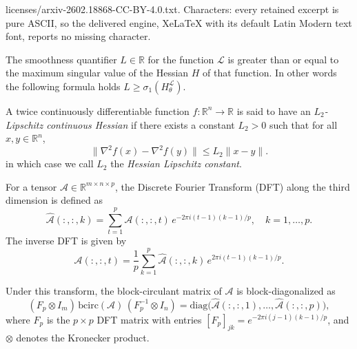 \documentclass[10pt,a4paper]{amsart}
\begin{document}
licenses/arxiv-2602.18868-CC-BY-4.0.txt. Characters: every retained excerpt is pure ASCII, so the delivered engine, XeLaTeX with its default Latin Modern text font, reports no missing character.
\begin{proposition}
\label{prop:L-lower-bound-app}
The smoothness quantifier $L \in \mathbb{R}$ for the function $\mathcal{L}$ is greater than or equal to the maximum singular value of the Hessian $H$ of that function. In other words the following formula holds
$L \geq \sigma_1(H_{\theta}^{\mathcal{L}})$.
\end{proposition}

\begin{definition}
\label{def:lip-cont-hes}
A twice continuously differentiable function $f:\mathbb{R}^n\to\mathbb{R}$ 
is said to have an \emph{$L_2$-Lipschitz continuous Hessian} if there exists a constant $L_2>0$ such that
for all $x,y\in\mathbb{R}^n$,
\[
\|\nabla^{2} f(x)-\nabla^{2} f(y)\|\le L_2\|x-y\|.
\]
in which case we call $L_2$ the \emph{Hessian Lipschitz constant}.
\end{definition}

\begin{definition}
\label{def:dft}
For a tensor $\mathcal{A}\in\mathbb{R}^{m\times n\times p}$, 
the Discrete Fourier Transform (DFT) along the third dimension is defined as
\[
\widehat{\mathcal{A}}(:,:,k)
= \sum_{t=1}^{p}\mathcal{A}(:,:,t)\,e^{-2\pi i (t-1)(k-1)/p}, 
\quad k=1,\dots,p.
\]
The inverse DFT is given by
\[
\mathcal{A}(:,:,t)
= \frac{1}{p}\sum_{k=1}^{p}\widehat{\mathcal{A}}(:,:,k)\,e^{2\pi i (t-1)(k-1)/p}.
\]

Under this transform, the block-circulant matrix of $\mathcal{A}$ is block-diagonalized as
\[
(F_p\otimes I_m)\,\mathrm{bcirc}(\mathcal{A})\,(F_p^{-1}\otimes I_n)
= \mathrm{diag}\big(\widehat{\mathcal{A}}(:,:,1),\dots,\widehat{\mathcal{A}}(:,:,p)\big),
\]
where $F_p$ is the $p\times p$ DFT matrix with entries $[F_p]_{jk} = e^{-2\pi i (j-1)(k-1)/p}$, and $\otimes$ denotes the Kronecker product.
\end{definition}
\end{document}
